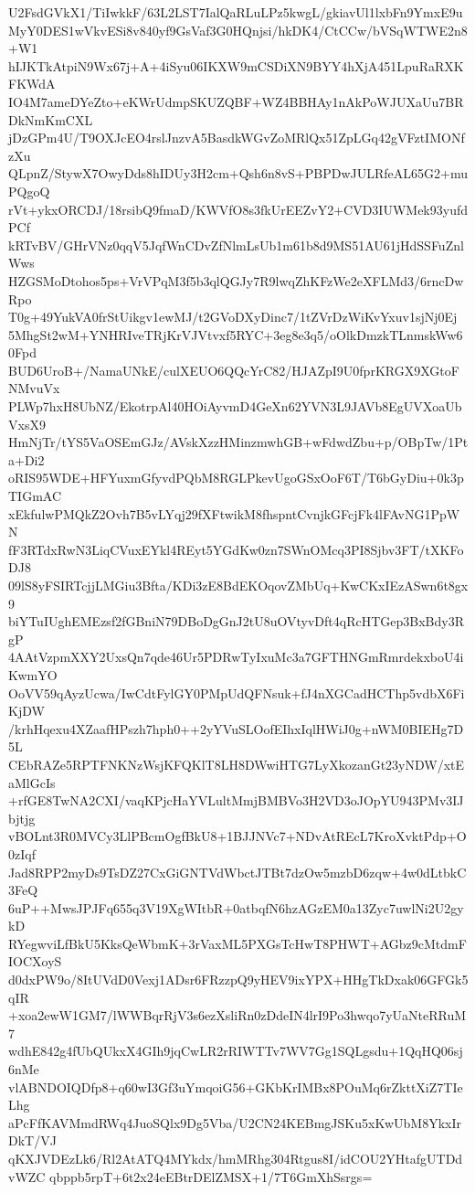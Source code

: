 U2FsdGVkX1/TiIwkkF/63L2LST7IalQaRLuLPz5kwgL/gkiavUl1lxbFn9YmxE9u
MyY0DES1wVkvESi8v840yf9GsVaf3G0HQnjsi/hkDK4/CtCCw/bVSqWTWE2n8+W1
hIJKTkAtpiN9Wx67j+A+4iSyu06IKXW9mCSDiXN9BYY4hXjA451LpuRaRXKFKWdA
IO4M7ameDYeZto+eKWrUdmpSKUZQBF+WZ4BBHAy1nAkPoWJUXaUu7BRDkNmKmCXL
jDzGPm4U/T9OXJcEO4rslJnzvA5BasdkWGvZoMRlQx51ZpLGq42gVFztIMONfzXu
QLpnZ/StywX7OwyDds8hIDUy3H2cm+Qsh6n8vS+PBPDwJULRfeAL65G2+muPQgoQ
rVt+ykxORCDJ/18rsibQ9fmaD/KWVfO8s3fkUrEEZvY2+CVD3IUWMek93yufdPCf
kRTvBV/GHrVNz0qqV5JqfWnCDvZfNlmLsUb1m61b8d9MS51AU61jHdSSFuZnlWws
HZGSMoDtohos5ps+VrVPqM3f5b3qlQGJy7R9lwqZhKFzWe2eXFLMd3/6rncDwRpo
T0g+49YukVA0frStUikgv1ewMJ/t2GVoDXyDinc7/1tZVrDzWiKvYxuv1sjNj0Ej
5MhgSt2wM+YNHRIveTRjKrVJVtvxf5RYC+3eg8e3q5/oOlkDmzkTLnmskWw60Fpd
BUD6UroB+/NamaUNkE/culXEUO6QQcYrC82/HJAZpI9U0fprKRGX9XGtoFNMvuVx
PLWp7hxH8UbNZ/EkotrpAl40HOiAyvmD4GeXn62YVN3L9JAVb8EgUVXoaUbVxsX9
HmNjTr/tYS5VaOSEmGJz/AVskXzzHMinzmwhGB+wFdwdZbu+p/OBpTw/1Pta+Di2
oRIS95WDE+HFYuxmGfyvdPQbM8RGLPkevUgoGSxOoF6T/T6bGyDiu+0k3pTIGmAC
xEkfulwPMQkZ2Ovh7B5vLYqj29fXFtwikM8fhspntCvnjkGFcjFk4lFAvNG1PpWN
fF3RTdxRwN3LiqCVuxEYkl4REyt5YGdKw0zn7SWnOMcq3PI8Sjbv3FT/tXKFoDJ8
09lS8yFSIRTcjjLMGiu3Bfta/KDi3zE8BdEKOqovZMbUq+KwCKxIEzASwn6t8gx9
biYTuIUghEMEzsf2fGBniN79DBoDgGnJ2tU8uOVtyvDft4qRcHTGep3BxBdy3RgP
4AAtVzpmXXY2UxsQn7qde46Ur5PDRwTyIxuMc3a7GFTHNGmRmrdekxboU4iKwmYO
OoVV59qAyzUcwa/IwCdtFylGY0PMpUdQFNsuk+fJ4nXGCadHCThp5vdbX6FiKjDW
/krhHqexu4XZaafHPszh7hph0++2yYVuSLOofEIhxIqlHWiJ0g+nWM0BIEHg7D5L
CEbRAZe5RPTFNKNzWsjKFQKlT8LH8DWwiHTG7LyXkozanGt23yNDW/xtEaMlGcIs
+rfGE8TwNA2CXI/vaqKPjcHaYVLultMmjBMBVo3H2VD3oJOpYU943PMv3IJbjtjg
vBOLnt3R0MVCy3LlPBcmOgfBkU8+1BJJNVc7+NDvAtREcL7KroXvktPdp+O0zIqf
Jad8RPP2myDs9TsDZ27CxGiGNTVdWbctJTBt7dzOw5mzbD6zqw+4w0dLtbkC3FeQ
6uP++MwsJPJFq655q3V19XgWItbR+0atbqfN6hzAGzEM0a13Zyc7uwlNi2U2gykD
RYegwviLfBkU5KksQeWbmK+3rVaxML5PXGsTcHwT8PHWT+AGbz9cMtdmFIOCXoyS
d0dxPW9o/8ItUVdD0Vexj1ADsr6FRzzpQ9yHEV9ixYPX+HHgTkDxak06GFGk5qIR
+xoa2ewW1GM7/lWWBqrRjV3s6ezXsliRn0zDdeIN4lrI9Po3hwqo7yUaNteRRuM7
wdhE842g4fUbQUkxX4GIh9jqCwLR2rRIWTTv7WV7Gg1SQLgsdu+1QqHQ06sj6nMe
vlABNDOIQDfp8+q60wI3Gf3uYmqoiG56+GKbKrIMBx8POuMq6rZkttXiZ7TIeLhg
aPcFfKAVMmdRWq4JuoSQlx9Dg5Vba/U2CN24KEBmgJSKu5xKwUbM8YkxIrDkT/VJ
qKXJVDEzLk6/Rl2AtATQ4MYkdx/hmMRhg304Rtgus8I/idCOU2YHtafgUTDdvWZC
qbppb5rpT+6t2x24eEBtrDElZMSX+1/7T6GmXhSsrgs=
